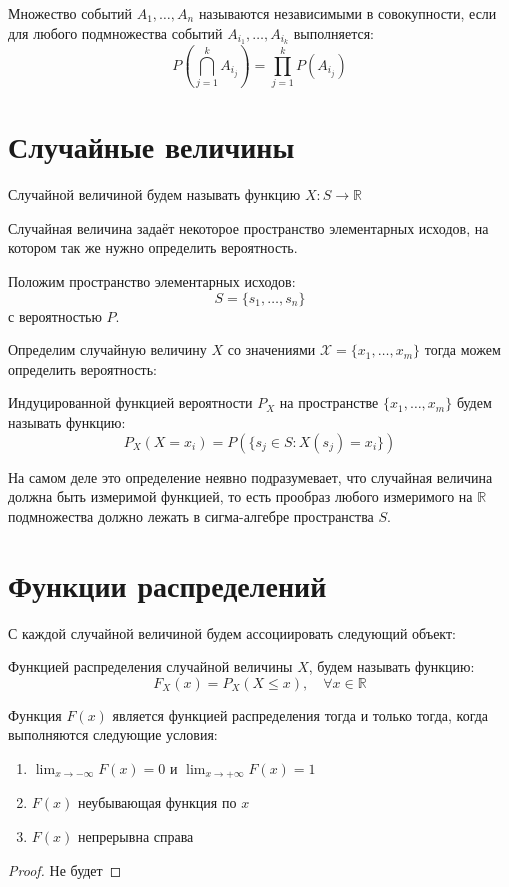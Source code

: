 \documentclass[document]{subfiles}
\begin{document}
\begin{definition}
    Множество событий $A_1, \dots, A_n$ называются независимыми в совокупности, если для любого подмножества событий $A_{i_1}, \dots, A_{i_k}$ выполняется:
    \[P \left(\bigcap_{j=1}^k A_{i_j}\right) = \prod_{j=1}^k P(A_{i_j})\]
\end{definition}

\section{Случайные величины}

\begin{definition}
    Случайной величиной будем называть функцию $X: S \to \mathbb{R}$
\end{definition}

Случайная величина задаёт некоторое пространство элементарных исходов, на котором так же нужно определить вероятность.

Положим пространство элементарных исходов:
\[S = \{s_1, \dots, s_n\}\]
с вероятностью $P$.

Определим случайную величину $X$ со значениями $\mathcal{X} = \{x_1, \dots, x_m\}$ тогда можем определить вероятность:

\begin{definition}
    Индуцированной функцией вероятности $P_X$ на пространстве $\{x_1, \dots, x_m\}$ будем называть функцию:
    \[P_X(X = x_i) = P(\{s_j \in S: X(s_j) = x_i\})\]
\end{definition}
На самом деле это определение неявно подразумевает, что случайная величина должна быть измеримой функцией, то есть прообраз любого измеримого на $\mathbb{R}$ подмножества должно лежать в сигма-алгебре пространства $S$.

\section{Функции распределений}

С каждой случайной величиной будем ассоциировать следующий объект:
\begin{definition}
    Функцией распределения случайной величины $X$, будем называть функцию:
    \[F_X(x) = P_X(X \le x), \quad \forall x \in \mathbb{R}\]
\end{definition}

\begin{theorem}
    Функция $F(x)$ является функцией распределения тогда и только тогда, когда выполняются следующие условия:
    \begin{enumerate}
        \item $\lim_{x \to -\infty} F(x) = 0$ и $\lim_{x \to +\infty}F(x) = 1$
        \item $F(x)$ неубывающая функция по $x$
        \item $F(x)$ непрерывна справа
    \end{enumerate}
\end{theorem}
\begin{proof}
    Не будет
\end{proof}
\end{document}
